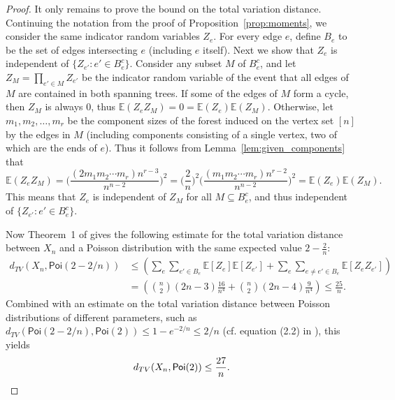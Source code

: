 \documentclass[a4paper,12pt,reqno]{amsart}
\theoremstyle{remark}
\newcommand{\Ex}{\mathbb{E}}
\newcommand{\Poi}{\mathsf{Poi}}
\begin{document}
\begin{proof}
    It only remains to prove the bound on the total variation distance. Continuing the notation from the proof of Proposition~\ref{prop:moments}, we consider the same indicator random variables $Z_e$. For every edge $e$, define $B_e$ to be the set of edges intersecting $e$ (including $e$ itself). Next we show that $Z_e$ is independent of $\{Z_{e'}:e'\in B_e^c\}$. Consider any subset $M$ of $B_e^c$, and let $Z_M = \prod_{e' \in M} Z_{e'}$ be the indicator random variable of the event that all edges of $M$ are contained in both spanning trees. If some of the edges of $M$ form a cycle, then $Z_M$ is always $0$, thus $\Ex(Z_eZ_M) = 0 = \Ex(Z_e)\Ex(Z_M)$. Otherwise, let $m_1,m_2,\ldots,m_r$ be the component sizes of the forest induced on the vertex set $[n]$ by the edges in $M$ (including components consisting of a single vertex, two of which are the ends of $e$). Thus it follows from Lemma~\ref{lem:given_components} that 
    \[\Ex(Z_eZ_M) = \Big( \frac{(2m_1m_2 \cdots m_r)n^{r-3}}{n^{n-2}} \Big)^2 = \Big( \frac{2}{n} \Big)^2 \Big( \frac{(m_1m_2 \cdots m_r)n^{r-2}}{n^{n-2}} \Big)^2 = \Ex(Z_e)\Ex(Z_M).\]
    This means that $Z_e$ is independent of $Z_M$ for all $M \subseteq B_e^c$, and thus independent of $\{Z_{e'}:e'\in B_e^c\}$.
    
Now Theorem~1 of \cite{AGG89} gives the following estimate for the total variation distance between $X_n$ and a Poisson distribution with the same expected value $2 - \frac{2}{n}$:
    \begin{align*}
        d_{TV}(X_n,\Poi(2-2/n)) 
        &\leq \left( \sum_{e} \sum_{e'\in B_e} \Ex[Z_e]\Ex[Z_{e'}] + \sum_{e} \sum_{e\neq e'\in B_e} \Ex[Z_eZ_{e'}]\right)\\
        &= \left( \binom{n}{2} (2n-3) \frac{16}{n^4} + \binom{n}{2} (2n-4) \frac{9}{n^4} \right) \leq \frac{25}{n}.
    \end{align*}
    Combined with an estimate on the total variation distance between Poisson distributions of different parameters, such as $d_{TV}(\Poi(2-2/n),\Poi(2))\leq 1-e^{-2/n} \leq 2/n$ (cf. equation (2.2) in \cite{AJ05}), this yields 
    \[
        d_{TV}(X_n,\Poi(2)) \leq \frac{27}{n}.\qedhere
    \]
\end{proof}
\end{document}
